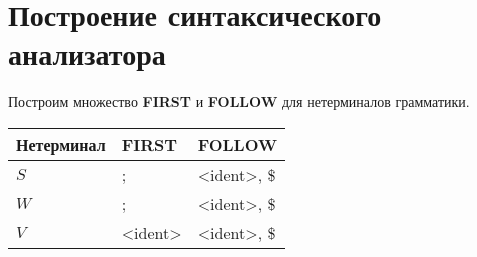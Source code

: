 \section{Построение синтаксического анализатора}

Построим множество \textbf{FIRST} и \textbf{FOLLOW} для нетерминалов грамматики.

\begin{center}
    \begin{tabular}{ | l | l | l | }
        \hline
        \textbf{Нетерминал} & \textbf{FIRST} & \textbf{FOLLOW} \\
        \hline
        $S$ & ; & <ident>, \$ \\
        \hline
        $W$ & ; & <ident>, \$ \\
        \hline
        $V$ & <ident> & <ident>, \$ \\
        \hline
    \end{tabular}
\end{center}
